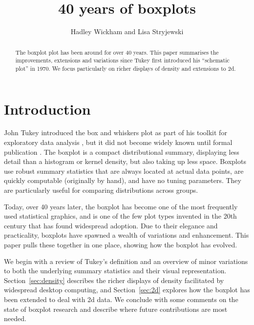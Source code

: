 \documentclass[oneside]{article}
\title{40 years of boxplots}
\author{Hadley Wickham and Lisa Stryjewski}
\begin{document}
\maketitle

\begin{abstract}

  The boxplot plot has been around for over 40 years. This paper summarises the improvements, extensions and variations since Tukey first introduced his ``schematic plot'' in 1970. We focus particularly on richer displays of density and extensions to 2d.

\end{abstract}

\section{Introduction}


John Tukey introduced the box and whiskers plot as part of his toolkit for exploratory data analysis \citep{tukey:1970}, but it did not become widely known until formal publication \citep{tukey:1977}. The boxplot is a compact distributional summary, displaying less detail than a histogram or kernel density, but also taking up less space. Boxplots use robust summary statistics that are always located at actual data points, are quickly computable (originally by hand), and have no tuning parameters. They are particularly useful for comparing distributions across groups.

Today, over 40 years later, the boxplot has become one of the most frequently used statistical graphics, and is one of the few plot types invented in the 20th century that has found widespread adoption. Due to their elegance and practicality, boxplots have spawned a wealth of variations and enhancement. This paper pulls these together in one place, showing how the boxplot has evolved.

We begin with a review of Tukey's definition and an overview of minor variations to both the underlying summary statistics and their visual representation. Section~\ref{sec:density} describes the richer displays of density facilitated by widespread desktop computing, and Section~\ref{sec:2d} explores how the boxplot has been extended to deal with 2d data. We conclude with some comments on the state of boxplot research and describe where future contributions are most needed.
\end{document}
